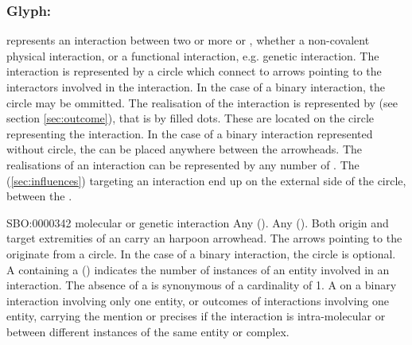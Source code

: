 
\subsubsection{Glyph: }\label{sec:interaction}

 represents an interaction between two or more  or , whether a non-covalent physical interaction, or a functional interaction, e.g. genetic interaction. The interaction is represented by a circle which connect to arrows pointing to the interactors involved in the interaction. In the case of a binary interaction, the circle may be ommitted. The realisation of the interaction is represented by  (see section \ref{sec:outcome}), that is by filled dots. These  are located on the circle representing the interaction. In the case of a binary interaction represented without circle, the  can be placed anywhere between the arrowheads. The realisations of an interaction can be represented by any number of . The  (\ref{sec:influences}) targeting an interaction end up on the external side of the circle, between the .

\begin{glyphDescription}
 \glyphSboTerm SBO:0000342 molecular or genetic interaction
 \glyphOrigin Any  ().
 \glyphTarget Any  ().
 \glyphEndPoint Both origin and target extremities of an  carry an harpoon arrowhead. The arrows pointing to the  originate from a circle. In the case of a binary interaction, the circle is optional. 
\glyphAux A  containing a  () indicates the number of instances of an entity involved in an interaction. The absence of a  is synonymous of a cardinality of 1. A  on a binary interaction involving only one entity, or outcomes of interactions involving one entity, carrying the mention  or  precises if the interaction is intra-molecular or between different instances of the same entity or complex.
 \end{glyphDescription}

